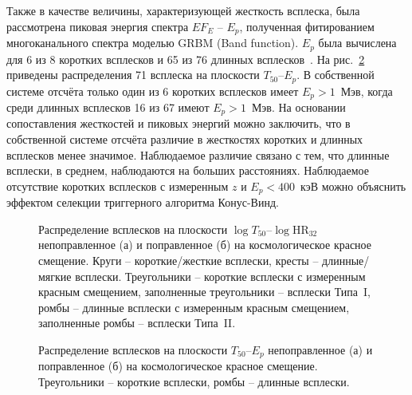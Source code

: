 Также в качестве величины, характеризующей жесткость всплеска, была рассмотрена пиковая энергия спектра $E F_E$ -- $E_p$, полученная фитированием многоканального спектра моделью GRBM (Band function). $E_p$ была вычислена для 6 из 8 коротких всплесков и 65 из 76 длинных всплесков~\citep{Tsvetkova_2014}. На рис.~\ref{img:T50EpzCorr} приведены распределения 71 всплеска на плоскости $T_{50}$--$E_p$. В собственной системе отсчёта только один из 6 коротких всплесков имеет $E_p > 1$~Мэв, когда среди длинных всплесков 16 из 67 имеют $E_p > 1$~Мэв. На основании сопоставления жесткостей и пиковых энергий можно заключить, что в собственной системе отсчёта  различие в жесткостях коротких и длинных всплесков менее значимое. Наблюдаемое различие связано с тем, что длинные всплески, в среднем, наблюдаются на больших расстояниях. Наблюдаемое отсутствие коротких всплесков с измеренным $z$ и $E_p <400$~кэВ можно объяснить эффектом селекции триггерного алгоритма Конус-Винд. 

\begin{figure}[h]
  \begin{minipage}[h]{0.5\textwidth}
  \end{minipage}
  \hfill
  \begin{minipage}[h]{0.5\textwidth}
  \end{minipage}
  \caption{Распределение всплесков на плоскости $\log T_{50}$--$\log \mbox{HR}_{32}$ непоправленное (а) и поправленное (б) на космологическое красное смещение. Круги -- короткие/жесткие всплески, кресты -- длинные/мягкие всплески. Треугольники -- короткие всплески с измеренным красным смещением, заполненные треугольники -- всплески Типа~I, ромбы -- длинные всплески с измеренным красным смещением, заполненные ромбы -- всплески Типа~II.}
  \label{img:T50HRzCorr}  
\end{figure}

\begin{figure}[h]
  \begin{minipage}[h]{0.5\textwidth}
  \end{minipage}
  \hfill
  \begin{minipage}[h]{0.5\textwidth}
  \end{minipage}
  \caption{Распределение всплесков на плоскости $T_{50}$--$E_p$ непоправленное (а) и поправленное (б) на космологическое красное смещение. Треугольники -- короткие всплески, ромбы -- длинные всплески.}
  \label{img:T50EpzCorr}  
\end{figure}
\clearpage


